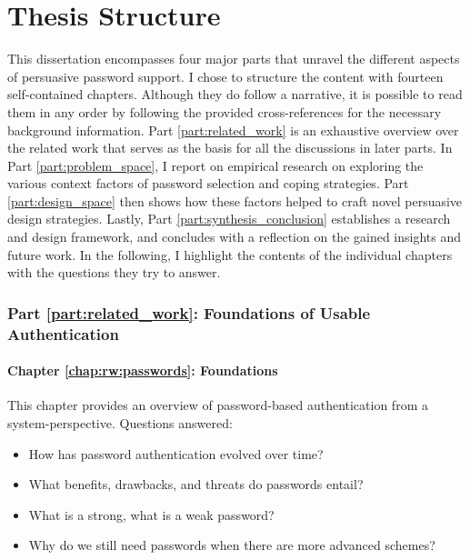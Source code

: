 \section{Thesis Structure}
This dissertation encompasses four major parts that unravel the different aspects of persuasive password support. I chose to structure the content with fourteen self-contained chapters. Although they do follow a narrative, it is possible to read them in any order by following the provided cross-references for the necessary background information. Part \ref{part:related_work} is an exhaustive overview over the related work that serves as the basis for all the discussions in later parts. In Part \ref{part:problem_space}, I report on empirical research on exploring the various context factors of password selection and coping strategies. Part \ref{part:design_space} then shows how these factors helped to craft novel persuasive design strategies. Lastly, Part \ref{part:synthesis_conclusion} establishes a research and design framework, and concludes with a reflection on the gained insights and future work. In the following, I highlight the contents of the individual chapters with the questions they try to answer.


\subsubsection{Part \ref{part:related_work}: Foundations of Usable Authentication}

\paragraph{Chapter \ref{chap:rw:passwords}: Foundations} %
This chapter provides an overview of password-based authentication from a system-perspective. 
Questions answered: \vspace*{-5pt} \begin{itemize}[leftmargin=*,itemsep=-5pt]
	\item How has password authentication evolved over time?
	\item What benefits, drawbacks, and threats do passwords entail?
	\item What is a strong, what is a weak password?
	\item Why do we still need passwords when there are more advanced schemes?
\end{itemize}

